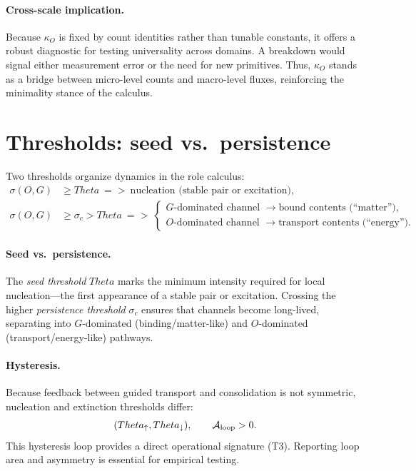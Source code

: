 \documentclass[12pt,a4paper,oneside]{scrreprt}
\def\Theta{Theta}%
\def\Rightarrow{=>}%
\begin{document}
\paragraph{Cross-scale implication.} 
Because $\kappa_O$ is fixed by count identities rather than tunable constants, 
it offers a robust diagnostic for testing universality across domains. 
A breakdown would signal either measurement error or the need for new primitives. 
Thus, $\kappa_O$ stands as a bridge between micro-level counts and macro-level 
fluxes, reinforcing the minimality stance of the calculus.

\section{Thresholds: seed vs.\ persistence}\label{sec:ur-thresholds}

Two thresholds organize dynamics in the role calculus: 
\begin{align}
\sigma(O,G) &\ge \Theta 
\ \Rightarrow\ \text{nucleation (stable pair or excitation)}, \\
\sigma(O,G) &\ge \sigma_c > \Theta 
\ \Rightarrow\ 
\begin{cases}
\text{$G$-dominated channel } \to \text{bound contents (``matter'')}, \\
\text{$O$-dominated channel } \to \text{transport contents (``energy'')}.
\end{cases}
\end{align}

\paragraph{Seed vs.\ persistence.} 
The \emph{seed threshold} $\Theta$ marks the minimum intensity required for 
local nucleation---the first appearance of a stable pair or excitation. 
Crossing the higher \emph{persistence threshold} $\sigma_c$ ensures that 
channels become long-lived, separating into $G$-dominated (binding/matter-like) 
and $O$-dominated (transport/energy-like) pathways. 

\paragraph{Hysteresis.} 
Because feedback between guided transport and consolidation 
is not symmetric, nucleation and extinction thresholds differ: 
\[
(\Theta_\uparrow, \Theta_\downarrow), \qquad 
\mathcal A_{\rm loop} > 0.
\]
This hysteresis loop provides a direct operational signature (T3). 
Reporting loop area and asymmetry is essential for empirical testing. 
\end{document}
